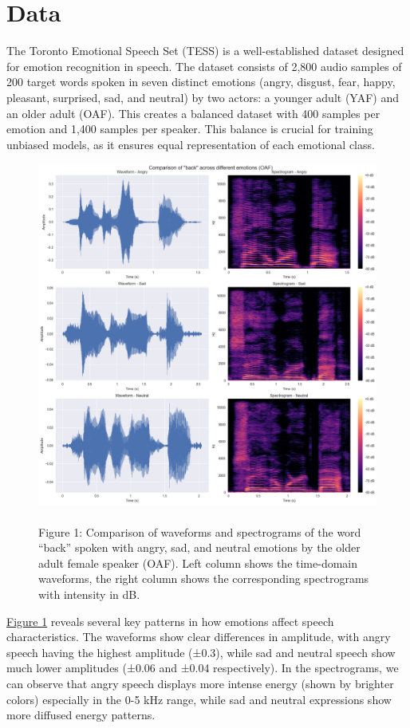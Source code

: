 \documentclass[../main.tex]{subfiles}
\begin{document}
\section{Data}
The Toronto Emotional Speech Set (TESS) is a well-established dataset
designed for emotion recognition in speech. The dataset consists of 2,800
audio samples of 200 target words spoken in seven distinct emotions
(angry, disgust, fear, happy, pleasant, surprised, sad, and neutral)
by two actors: a younger adult (YAF) and an older adult (OAF).
This creates a balanced dataset with 400 samples per emotion and 1,400
samples per speaker. This balance is crucial for training unbiased models,
as it ensures equal representation of each emotional class.
\begin{figure}[h]
    \centering
    \includegraphics[width= 350pt]{tess_analysis.png}
    \caption{\\Figure 1: Comparison of waveforms and spectrograms of the word ``back'' spoken with angry, sad, and neutral emotions by the older adult female speaker (OAF). Left column shows the time-domain waveforms, the right column shows the corresponding spectrograms with intensity in dB.}
    \label{fig:analysis}
\end{figure}
\hyperref[fig:analysis]{Figure 1} reveals several key patterns in how emotions affect
speech characteristics. The waveforms show clear differences in amplitude, with
angry speech having the highest amplitude (±0.3), while sad and neutral speech
show much lower amplitudes (±0.06 and ±0.04 respectively). In the spectrograms,
we can observe that angry speech displays more intense energy
(shown by brighter colors) especially in the 0-5 kHz range, while sad and
neutral expressions show more diffused energy patterns.
\end{document}
